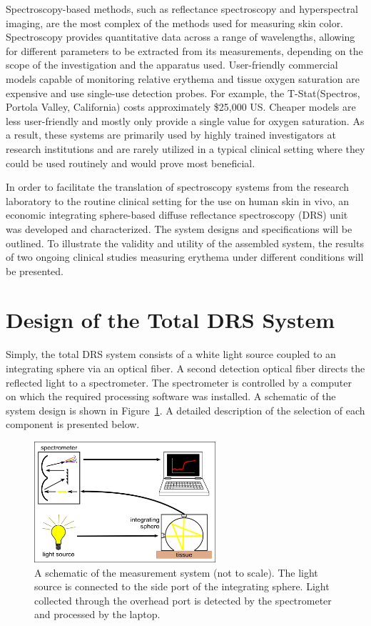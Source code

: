 Spectroscopy-based methods, such as reflectance spectroscopy and hyperspectral imaging, are the most complex of the methods used for measuring skin color.\cite{Zhang2005,Stamatas2008,Kollias2010,Yudovsky2010,Chin2012} Spectroscopy provides quantitative data across a range of wavelengths, allowing for different parameters to be extracted from its measurements, depending on the scope of the investigation and the apparatus used. User-friendly commercial models capable of monitoring relative erythema and tissue oxygen saturation are expensive and use single-use detection probes. For example, the T-Stat\textregistered (Spectros, Portola Valley, California) costs approximately \$25,000 US.\cite{Fox2012} Cheaper models are less user-friendly and mostly only provide a single value for oxygen saturation. As a result, these systems are primarily used by highly trained investigators at research institutions and are rarely utilized in a typical clinical setting where they could be used routinely and would prove most beneficial.

In order to facilitate the translation of spectroscopy systems from the research laboratory to the routine clinical setting for the use on human skin in vivo, an economic integrating sphere-based diffuse reflectance spectroscopy (DRS) unit was developed and characterized. The system designs and specifications will be outlined. To illustrate the validity and utility of the assembled system, the results of two ongoing clinical studies measuring erythema under different conditions will be presented.

\section{Design of the Total DRS System}
Simply, the total DRS system consists of a white light source coupled to an integrating sphere via an optical fiber. A second detection optical fiber directs the reflected light to a spectrometer. The spectrometer is controlled by a computer on which the required processing software was installed. A schematic of the system design is shown in Figure~\ref{fig:p1-sys_diagram}. A detailed description of the selection of each component is presented below.

\begin{figure}
	\centering \includegraphics[width=0.6\textwidth]{figures/p1-sys_diagram.png}
	\caption[System schematic]{\label{fig:p1-sys_diagram}A schematic of the measurement system (not to scale). The light source is connected to the side port of the integrating sphere. Light collected through the overhead port is detected by the spectrometer and processed by the laptop.}
\end{figure}

